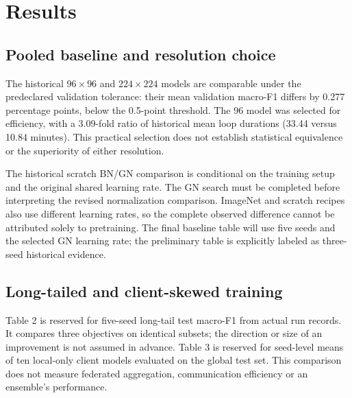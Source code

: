 \section{Results}
\subsection{Pooled baseline and resolution choice}
The historical $96\times96$ and $224\times224$ models are comparable under the predeclared validation tolerance: their mean validation macro-F1 differs by 0.277 percentage points, below the 0.5-point threshold. The 96 model was selected for efficiency, with a 3.09-fold ratio of historical mean loop durations (33.44 versus 10.84 minutes). This practical selection does not establish statistical equivalence or the superiority of either resolution.

The historical scratch BN/GN comparison is conditional on the training setup and the original shared learning rate. The GN search must be completed before interpreting the revised normalization comparison. ImageNet and scratch recipes also use different learning rates, so the complete observed difference cannot be attributed solely to pretraining. The final baseline table will use five seeds and the selected GN learning rate; the preliminary table is explicitly labeled as three-seed historical evidence.

\subsection{Long-tailed and client-skewed training}
Table 2 is reserved for five-seed long-tail test macro-F1 from actual run records. It compares three objectives on identical subsets; the direction or size of an improvement is not assumed in advance.
Table 3 is reserved for seed-level means of ten local-only client models evaluated on the global test set. This comparison does not measure federated aggregation, communication efficiency or an ensemble's performance.

